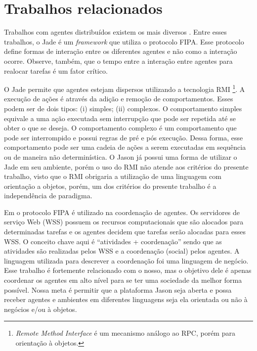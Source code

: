 \section{Trabalhos relacionados} \label{sec-relacionado}

Trabalhos com agentes distribuídos existem os mais diversos
\cite{bellifemine1999jade,Buhler03adaptiveworkflow,piunti2009soa}. Entre
esses trabalhos, o Jade é um \emph{framework} que utiliza o protocolo FIPA.
Esse protocolo define formas de interação entre os diferentes agentes
\cite{bellifemine1999jade} e não como a interação ocorre. Observe, também,
que o tempo entre a interação entre agentes para realocar tarefas é um fator
crítico.

O Jade permite que agentes estejam dispersos utilizando a tecnologia
RMI \footnote{\emph{Remote Method Interface} é
um mecanismo análogo ao RPC, porém para orientação à objetos.}. A execução
de ações é através da adição e remoção de comportamentos. Esses
podem ser de dois tipos: (i) simples; (ii) complexos. O comportamento simples
equivale a uma ação executada sem interrupção que pode ser repetida até
se obter o que se deseja. O comportamento complexo é um comportamento que pode
ser interrompido e possui regras de pré e pós execução. Dessa forma, esse
comportamento pode ser uma cadeia de ações a serem executadas em sequência ou
de maneira não determinística. O Jason já possui uma forma de utilizar o Jade
em seu ambiente, porém o uso do RMI não atende aos critérios do presente
trabalho, visto que o RMI obrigaria a utilização de uma linguagem com
orientação a objetos, porém, um dos critérios do presente trabalho é a
independência de paradigma.

Em \cite{Buhler03adaptiveworkflow} o protocolo FIPA é utilizado na coordenação
de agentes. Os servidores de serviço Web (WSS) possuem os recursos
computacionais que são alocados
para determinadas tarefas e os agentes decidem que tarefas serão alocadas para
esses WSS. O conceito chave aqui é ``atividades + coordenação'' sendo que as
atividades são realizadas pelos WSS e a coordenação (social) pelos agentes. A
linguagem utilizada para descrever a coordenação foi uma linguagem de negócio.
Esse trabalho é fortemente relacionado com o nosso, mas o objetivo dele é
apenas coordenar os agentes em alto nível para se ter uma sociedade da melhor
forma possível. Nossa meta é permitir que a plataforma Jason seja aberta e
possa receber agentes e ambientes em diferentes linguagens seja ela orientada
ou não à negócios e/ou à objetos.

